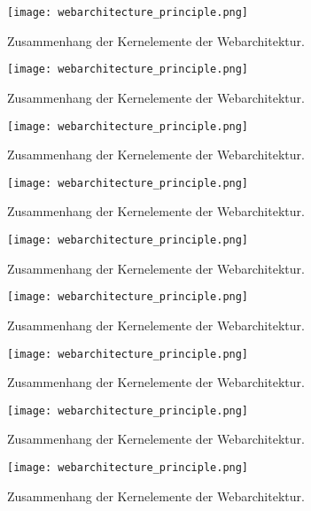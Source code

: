 \begin{figure}[H]
	\centering
	\texttt{[image: webarchitecture\_principle.png]}
	\caption[Zusammenhang der Kernelemente der Webarchitektur]{Zusammenhang der Kernelemente der Webarchitektur.\protect\footnotemark}
\end{figure}
\begin{figure}[H]
	\centering
	\texttt{[image: webarchitecture\_principle.png]}
	\caption[Zusammenhang der Kernelemente der Webarchitektur]{Zusammenhang der Kernelemente der Webarchitektur.\protect\footnotemark}
\end{figure}
\begin{figure}[H]
	\centering
	\texttt{[image: webarchitecture\_principle.png]}
	\caption[Zusammenhang der Kernelemente der Webarchitektur]{Zusammenhang der Kernelemente der Webarchitektur.\protect\footnotemark}
\end{figure}
\begin{figure}[H]
	\centering
	\texttt{[image: webarchitecture\_principle.png]}
	\caption[Zusammenhang der Kernelemente der Webarchitektur]{Zusammenhang der Kernelemente der Webarchitektur.\protect\footnotemark}
\end{figure}
\begin{figure}[H]
	\centering
	\texttt{[image: webarchitecture\_principle.png]}
	\caption[Zusammenhang der Kernelemente der Webarchitektur]{Zusammenhang der Kernelemente der Webarchitektur.\protect\footnotemark}
\end{figure}
\begin{figure}[H]
	\centering
	\texttt{[image: webarchitecture\_principle.png]}
	\caption[Zusammenhang der Kernelemente der Webarchitektur]{Zusammenhang der Kernelemente der Webarchitektur.\protect\footnotemark}
\end{figure}
\begin{figure}[H]
	\centering
	\texttt{[image: webarchitecture\_principle.png]}
	\caption[Zusammenhang der Kernelemente der Webarchitektur]{Zusammenhang der Kernelemente der Webarchitektur.\protect\footnotemark}
\end{figure}
\begin{figure}[H]
	\centering
	\texttt{[image: webarchitecture\_principle.png]}
	\caption[Zusammenhang der Kernelemente der Webarchitektur]{Zusammenhang der Kernelemente der Webarchitektur.\protect\footnotemark}
\end{figure}
\begin{figure}[H]
	\centering
	\texttt{[image: webarchitecture\_principle.png]}
	\caption[Zusammenhang der Kernelemente der Webarchitektur]{Zusammenhang der Kernelemente der Webarchitektur.\protect\footnotemark}
\end{figure}
